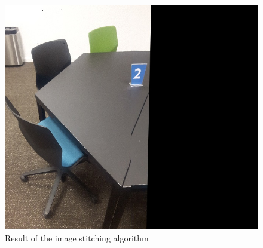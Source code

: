 \documentclass[a4paper, titlepage,12pt]{article}
\begin{document}
	\begin{figure}[H]
		\begin{center}
			\includegraphics[scale=0.6]{./stitched.jpg}
			\caption{Result of the image stitching algorithm}
		\end{center}
	\end{figure}
	\newpage
	\printbibliography
\end{document}
